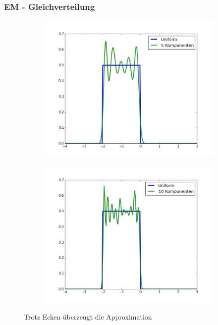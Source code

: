 \documentclass[11pt]{beamer}
\begin{document}
\begin{frame}
  \frametitle{EM - Gleichverteilung}
  \begin{figure}[h]
  \centering
  \begin{subfigure}{0.45\textwidth}
    \centering
    \includegraphics[width=\textwidth]{presentation/uniform-5-components}
  \end{subfigure}
  \hfill
  \begin{subfigure}{0.45\textwidth}
    \centering
    \includegraphics[width=\textwidth]{presentation/uniform-10-components}
  \end{subfigure}
  \caption{Trotz Ecken überzeugt die Approximation}
  \label{fig:em-uniform}
\end{figure}
\end{frame}
\end{document}
